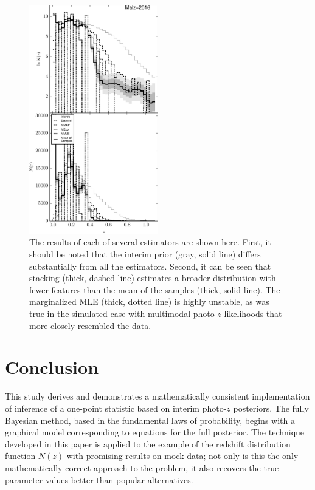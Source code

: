 \documentclass[preprint]{aastex}
\begin{document}
\begin{figure}
\includegraphics[width=0.5\textwidth]{figs/bias/comps.pdf}
\caption{The results of each of several estimators are shown here.  First, it 
should be noted that the interim prior (gray, solid line) differs substantially 
from all the estimators.  Second, it can be seen that stacking (thick, dashed 
line) estimates a broader distribution with fewer features than the mean of the 
samples (thick, solid line).  The marginalized MLE (thick, dotted line) is 
highly unstable, as was true in the simulated case with multimodal photo-$z$ 
likelihoods that more closely resembled the data.}
\label{fig:biascomp}
\end{figure}

\section{Conclusion}
\label{sec:con}

This study derives and demonstrates a mathematically consistent implementation 
of inference of a one-point statistic based on interim photo-$z$ posteriors.  
The fully Bayesian method, based in the fundamental laws of probability, begins 
with a graphical model corresponding to equations for the full posterior.  The 
technique developed in this paper is applied to the example of the redshift 
distribution function $N(z)$ with promising results on mock data; not only is 
this the only mathematically correct approach to the problem, it also recovers 
the true parameter values better than popular alternatives.  
\end{document}
